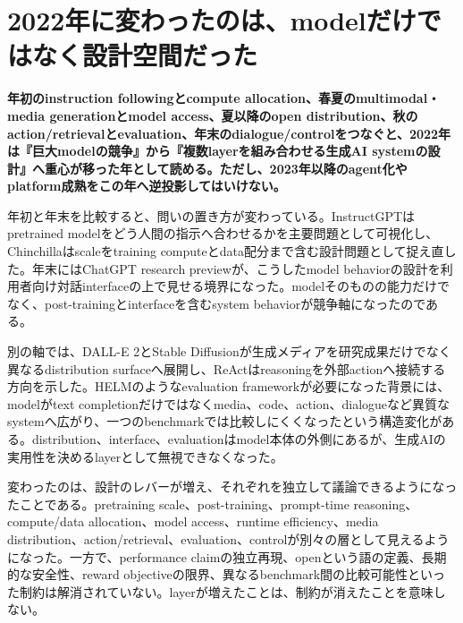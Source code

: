\section{2022年に変わったのは、modelだけではなく設計空間だった}
\noindent\textbf{年初のinstruction followingとcompute allocation、春夏のmultimodal・media generationとmodel access、夏以降のopen distribution、秋のaction/retrievalとevaluation、年末のdialogue/controlをつなぐと、2022年は『巨大modelの競争』から『複数layerを組み合わせる生成AI systemの設計』へ重心が移った年として読める。ただし、2023年以降のagent化やplatform成熟をこの年へ逆投影してはいけない。}\autocite{src-16a1a1dc486e,src-1e362767e63c,src-26aadbc0393f,src-27297a80fac0,src-2832ee43ab8f,src-2c38d2f354fa,src-6ffa5c4e64ca,src-811e1008822e,src-86ce6205a4ed,src-87477ad8b476,src-929080260e16,src-bc1a61aec959,src-e58f1e9c8754,src-e8da8e8f02bc}

年初と年末を比較すると、問いの置き方が変わっている。InstructGPTはpretrained modelをどう人間の指示へ合わせるかを主要問題として可視化し、Chinchillaはscaleをtraining computeとdata配分まで含む設計問題として捉え直した。年末にはChatGPT research previewが、こうしたmodel behaviorの設計を利用者向け対話interfaceの上で見せる境界になった。modelそのものの能力だけでなく、post-trainingとinterfaceを含むsystem behaviorが競争軸になったのである。\autocite{src-6ffa5c4e64ca,src-87477ad8b476,src-bc1a61aec959,src-e58f1e9c8754,src-e8da8e8f02bc}


別の軸では、DALL-E 2とStable Diffusionが生成メディアを研究成果だけでなく異なるdistribution surfaceへ展開し、ReActはreasoningを外部actionへ接続する方向を示した。HELMのようなevaluation frameworkが必要になった背景には、modelがtext completionだけではなくmedia、code、action、dialogueなど異質なsystemへ広がり、一つのbenchmarkでは比較しにくくなったという構造変化がある。distribution、interface、evaluationはmodel本体の外側にあるが、生成AIの実用性を決めるlayerとして無視できなくなった。\autocite{src-16a1a1dc486e,src-1e362767e63c,src-26aadbc0393f,src-27297a80fac0,src-2832ee43ab8f,src-2c38d2f354fa,src-811e1008822e,src-86ce6205a4ed,src-929080260e16}


変わったのは、設計のレバーが増え、それぞれを独立して議論できるようになったことである。pretraining scale、post-training、prompt-time reasoning、compute/data allocation、model access、runtime efficiency、media distribution、action/retrieval、evaluation、controlが別々の層として見えるようになった。一方で、performance claimの独立再現、openという語の定義、長期的な安全性、reward objectiveの限界、異なるbenchmark間の比較可能性といった制約は解消されていない。layerが増えたことは、制約が消えたことを意味しない。\autocite{src-1e362767e63c,src-26aadbc0393f,src-2832ee43ab8f,src-6ffa5c4e64ca,src-87477ad8b476,src-e58f1e9c8754,src-e8da8e8f02bc}


